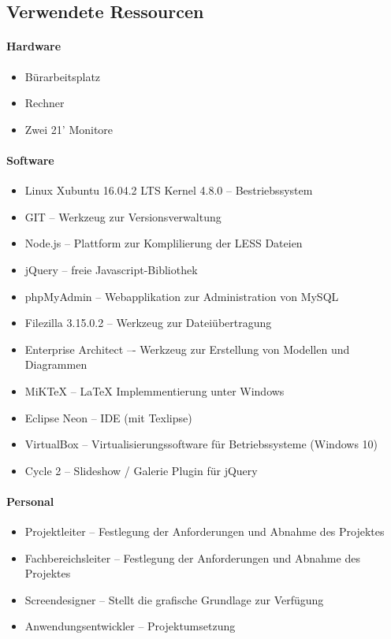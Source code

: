 \subsection{Verwendete Ressourcen}
\label{list:Ressourcenplanung}

\paragraph{Hardware}
\begin{itemize}
	\item Bürarbeitsplatz
	\item Rechner
	\item Zwei 21' Monitore
\end{itemize}

\paragraph{Software}
\begin{itemize}
	\item Linux Xubuntu 16.04.2 LTS Kernel 4.8.0 -- Bestriebssystem
	\item GIT -- Werkzeug zur Versionsverwaltung
	\item Node.js -- Plattform zur Komplilierung der LESS Dateien
	\item jQuery -- freie Javascript-Bibliothek	
	\item phpMyAdmin -- Webapplikation zur Administration von MySQL
	\item Filezilla 3.15.0.2 -- Werkzeug zur Dateiübertragung
	\item Enterprise Architect –- Werkzeug zur Erstellung von Modellen und
	Diagrammen
	\item MiKTeX -- LaTeX Implemmentierung unter Windows
	\item Eclipse Neon -- \ac{IDE} (mit Texlipse)
	\item VirtualBox -- Virtualisierungssoftware für Betriebssysteme (Windows
	10)
	\item Cycle 2 -- Slideshow / Galerie Plugin für jQuery

\end{itemize}

\paragraph{Personal}
\begin{itemize}
	\item Projektleiter -- Festlegung der Anforderungen und Abnahme des Projektes

	\item Fachbereichsleiter -- Festlegung der Anforderungen und Abnahme des
	Projektes
	\item Screendesigner -- Stellt die grafische Grundlage zur Verfügung
	\item Anwendungsentwickler -- Projektumsetzung
\end{itemize}